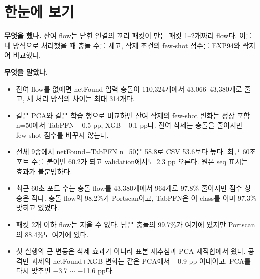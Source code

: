 
\usepackage{tabularx}


\section{한눈에 보기}
\textbf{무엇을 했나.} 잔여 flow는 닫힌 연결의 꼬리 패킷이 만든 패킷 1--2개짜리 flow다. 이를 네 방식으로 처리했을 때 충돌 수를 세고, 삭제 조건의 few-shot 점수를 EXP94와 짝지어 비교했다.

\textbf{무엇을 알았나.}
\begin{itemize}
\item 잔여 flow를 없애면 netFound 입력 충돌이 110,324개에서 43,066--43,380개로 줄고, 세 처리 방식의 차이는 최대 314개다.
\item 같은 PCA와 같은 학습 행으로 비교하면 잔여 삭제의 few-shot 변화는 정상 포함 n=50에서 TabPFN $-$0.5 pp, XGB $-$0.1 pp다. 잔여 삭제는 충돌을 줄이지만 few-shot 점수를 바꾸지 않는다.
\item 전체 9종에서 netFound+TabPFN n=50은 58.8로 CSV 53.6보다 높다. 최근 60초 포트 수를 붙이면 60.2가 되고 validation에서도 2.3 pp 오른다. 원본 seq 표시는 효과가 불분명하다.
\item 최근 60초 포트 수는 충돌 flow를 43,380개에서 964개로 97.8\% 줄이지만 점수 상승은 작다. 충돌 flow의 98.2\%가 Portscan이고, TabPFN은 이 class를 이미 97.3\% 맞히고 있었다.
\item 패킷 2개 이하 flow는 지울 수 없다. 남은 충돌의 99.7\%가 여기에 있지만 Portscan의 88.4\%도 여기에 있다.
\item 첫 실행의 큰 변동은 삭제 효과가 아니라 표본 재추첨과 PCA 재적합에서 왔다. 공격만 과제의 netFound+XGB 변화는 같은 PCA에서 $-$0.9 pp 이내이고, PCA를 다시 맞추면 $-$3.7 $\sim$ $-$11.6 pp다.
\end{itemize}


